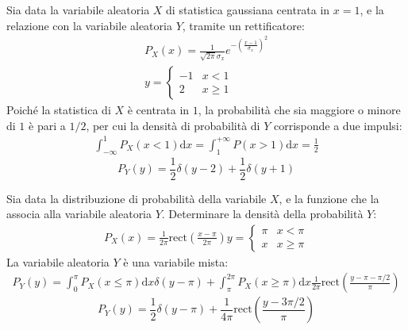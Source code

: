 \documentclass{article}
\newcommand{\rect}{\mathrm{rect}}
\newcommand{\df}{\mathrm{d}}
\begin{document}
Sia data la variabile aleatoria $X$ di statistica gaussiana centrata in $x=1$, e la relazione con la variabile aleatoria $Y$, tramite un rettificatore:
\begin{gather*}
    P_X(x)=\displaystyle\frac{1}{\sqrt{2\pi}\sigma_x}e^{-\left(\frac{x-1}{\sigma_x}\right)^2}\\
    y=\begin{cases}
        -1&x< 1\\
        2&x\geq 1
    \end{cases}
\end{gather*}
Poiché la statistica di $X$ è centrata in $1$, la probabilità che sia maggiore o minore di $1$ è pari a $1/2$, per cui la densità di probabilità di 
$Y$ corrisponde a due impulsi:
\begin{gather*}
    \displaystyle\int_{-\infty}^1P_X(x<1)\df x=\int_{1}^{+\infty}P(x>1)\df x=\frac{1}{2}
\end{gather*}
\begin{equation}
    P_Y(y)=\displaystyle\frac{1}{2}\delta(y-2)+\frac{1}{2}\delta(y+1)
\end{equation}


Sia data la distribuzione di probabilità della variabile $X$, e la funzione che la associa alla variabile aleatoria $Y$. Determinare la densità della probabilità $Y$:
\begin{gather*}
    P_X(x)=\displaystyle\frac{1}{2\pi}\rect\left(\frac{x-\pi}{2\pi}\right)
    y=\begin{cases}
        \pi &x<\pi\\
        x &x\geq\pi
    \end{cases}
\end{gather*}
La variabile aleatoria $Y$ è una variabile mista:
\begin{gather*}
    P_Y(y)=\displaystyle\int_0^{\pi}P_X(x\leq\pi)\df x\delta(y-\pi)+\int_{\pi}^{2\pi}P_X(x\geq\pi)\df x \frac{1}{2\pi}\rect\left(\frac{y-\pi-\pi/2}{\pi}\right)
\end{gather*}
\begin{equation}
    P_Y(y)=\displaystyle\frac{1}{2}\delta(y-\pi)+\frac{1}{4\pi}\rect\left(\frac{y-3\pi/2}{\pi}\right)
\end{equation}
\end{document}
